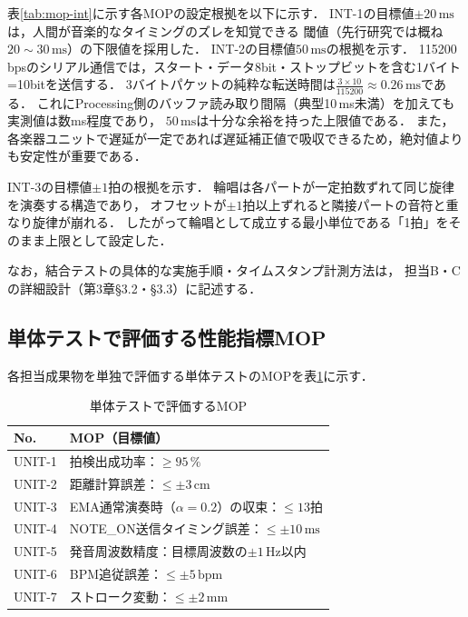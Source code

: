 表\ref{tab:mop-int}に示す各MOPの設定根拠を以下に示す．
INT-1の目標値$\pm 20\,\mathrm{ms}$は，人間が音楽的なタイミングのズレを知覚できる
閾値（先行研究では概ね$20\sim30\,\mathrm{ms}$\cite{sudo2007,kawase}）の下限値を採用した．
INT-2の目標値$50\,\mathrm{ms}$の根拠を示す．
115200\,bpsのシリアル通信では，スタート・データ8bit・ストップビットを含む1バイト=10bitを送信する．
3バイトパケットの純粋な転送時間は$\frac{3 \times 10}{115200} \approx 0.26\,\mathrm{ms}$である．
これにProcessing側のバッファ読み取り間隔（典型10\,ms未満）を加えても実測値は数ms程度であり，
$50\,\mathrm{ms}$は十分な余裕を持った上限値である．
また，各楽器ユニットで遅延が一定であれば遅延補正値で吸収できるため，絶対値よりも安定性が重要である．

INT-3の目標値$\pm 1$拍の根拠を示す．
輪唱は各パートが一定拍数ずれて同じ旋律を演奏する構造であり，
オフセットが$\pm 1$拍以上ずれると隣接パートの音符と重なり旋律が崩れる．
したがって輪唱として成立する最小単位である「1拍」をそのまま上限として設定した．

なお，結合テストの具体的な実施手順・タイムスタンプ計測方法は，
担当B・Cの詳細設計（第3章§3.2・§3.3）に記述する．

\subsection{単体テストで評価する性能指標MOP}

各担当成果物を単独で評価する単体テストのMOPを表\ref{tab:mop-unit}に示す．

\begin{table}[H]
  \centering
  \caption{単体テストで評価するMOP}
  \label{tab:mop-unit}
  \begin{tabularx}{\linewidth}{lX}
    \toprule
    No. & MOP（目標値） \\
    \midrule
    UNIT-1 & 拍検出成功率：$\geq 95\,\%$ \\
    UNIT-2 & 距離計算誤差：$\leq \pm 3\,\mathrm{cm}$ \\
    UNIT-3 & EMA通常演奏時（$\alpha=0.2$）の収束：$\leq 13$拍 \\
    UNIT-4 & NOTE\_ON送信タイミング誤差：$\leq \pm 10\,\mathrm{ms}$ \\
    UNIT-5 & 発音周波数精度：目標周波数の$\pm 1\,\mathrm{Hz}$以内 \\
    UNIT-6 & BPM追従誤差：$\leq \pm 5\,\mathrm{bpm}$ \\
    UNIT-7 & ストローク変動：$\leq \pm 2\,\mathrm{mm}$ \\
    \bottomrule
  \end{tabularx}
\end{table}

